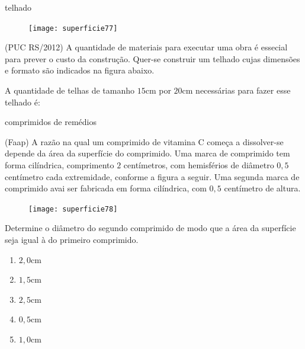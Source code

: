 \begin{task}{telhado}
\begin{figure}
\centering
\texttt{[image: superficie77]}

\end{figure}
(PUC RS/2012) A quantidade de materiais para executar uma obra é essecial para prever o custo da construção. Quer-se construir um telhado cujas dimensões e formato são indicados na figura abaixo.

A quantidade de telhas de tamanho $15$cm por $20$cm necessárias para fazer esse telhado é:


\end{task}

\clearpage

\begin{task}{comprimidos de remédios}

(Faap) A razão na qual um comprimido de vitamina C começa a dissolver-se depende da área da superfície do comprimido. Uma marca de comprimido tem forma cilíndrica, comprimento $2$ centímetros, com hemisférios de diâmetro $0{,}5$ centímetro cada extremidade, conforme a figura a seguir. Uma segunda marca de comprimido avai ser fabricada em forma cilíndrica, com $0{,}5$ centímetro de altura.

\begin{figure}
\centering

\texttt{[image: superficie78]}
\end{figure}
Determine o diâmetro do segundo comprimido de modo que a área da superfície seja igual à do primeiro comprimido.

\begin{enumerate}
  \item $2{,}0\text{cm}$
  \item $1{,}5\text{cm}$
  \item $2{,}5\text{cm}$
  \item $0{,}5\text{cm}$
  \item $1{,}0\text{cm}$
\end{enumerate}
\end{task}

